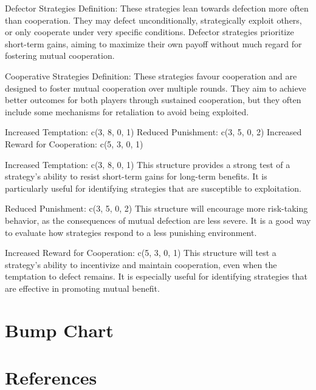 \documentclass[11pt,preprint]{elsarticle}
\numberwithin{equation}{section}
\numberwithin{figure}{section}
\numberwithin{table}{section}
\begin{document}
Defector Strategies Definition: These strategies lean towards defection
more often than cooperation. They may defect unconditionally,
strategically exploit others, or only cooperate under very specific
conditions. Defector strategies prioritize short-term gains, aiming to
maximize their own payoff without much regard for fostering mutual
cooperation.

Cooperative Strategies Definition: These strategies favour cooperation
and are designed to foster mutual cooperation over multiple rounds. They
aim to achieve better outcomes for both players through sustained
cooperation, but they often include some mechanisms for retaliation to
avoid being exploited.

Increased Temptation: c(3, 8, 0, 1) Reduced Punishment: c(3, 5, 0, 2)
Increased Reward for Cooperation: c(5, 3, 0, 1)

Increased Temptation: c(3, 8, 0, 1) This structure provides a strong
test of a strategy's ability to resist short-term gains for long-term
benefits. It is particularly useful for identifying strategies that are
susceptible to exploitation.

Reduced Punishment: c(3, 5, 0, 2) This structure will encourage more
risk-taking behavior, as the consequences of mutual defection are less
severe. It is a good way to evaluate how strategies respond to a less
punishing environment.

Increased Reward for Cooperation: c(5, 3, 0, 1) This structure will test
a strategy's ability to incentivize and maintain cooperation, even when
the temptation to defect remains. It is especially useful for
identifying strategies that are effective in promoting mutual benefit.

\section{Bump Chart}\label{bump-chart}

\newpage

\section*{References}\label{references}
\end{document}
